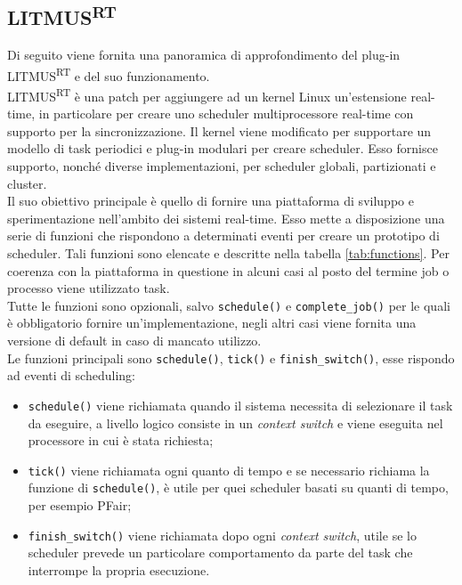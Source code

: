 \begin{appendices}

\section{LITMUS\textsuperscript{RT}}
\label{sec:litmus}

\noindent Di seguito viene fornita una panoramica di approfondimento del plug-in LITMUS\textsuperscript{RT} e del suo funzionamento.\\

\noindent LITMUS\textsuperscript{RT} è una patch per aggiungere ad un kernel Linux un'estensione real-time, in particolare per creare uno scheduler multiprocessore real-time con supporto per la sincronizzazione. Il kernel viene modificato per supportare un modello di task periodici e plug-in modulari per creare scheduler. Esso fornisce supporto, nonché diverse implementazioni, per scheduler globali, partizionati e cluster.\\

\noindent Il suo obiettivo principale è quello di fornire una piattaforma di sviluppo e sperimentazione nell'ambito dei sistemi real-time. Esso mette a disposizione una serie di funzioni che rispondono a determinati eventi per creare un prototipo di scheduler. Tali funzioni sono elencate e descritte nella tabella \ref{tab:functions}. Per coerenza con la piattaforma in questione in alcuni casi al posto del termine job o processo viene utilizzato task.\\

\noindent Tutte le funzioni sono opzionali, salvo \texttt{schedule()} e \texttt{complete\_job()} per le quali è obbligatorio fornire un'implementazione, negli altri casi viene fornita una versione di default in caso di mancato utilizzo.\\

\noindent Le funzioni principali sono \texttt{schedule()}, \texttt{tick()} e \texttt{finish\_switch()}, esse rispondo ad eventi di scheduling:\\

\begin{itemize}
	\item \texttt{schedule()} viene richiamata quando il sistema necessita di selezionare il task da eseguire, a livello logico consiste in un \textit{context switch} e viene eseguita nel processore in cui è stata richiesta;
	\item \texttt{tick()} viene richiamata ogni quanto di tempo e se necessario richiama la funzione di \texttt{schedule()}, è utile per quei scheduler basati su quanti di tempo, per esempio PFair;
	\item \texttt{finish\_switch()} viene richiamata dopo ogni \textit{context switch}, utile se lo scheduler prevede un particolare comportamento da parte del task che interrompe la propria esecuzione.\\
\end{itemize}


\end{appendices}
